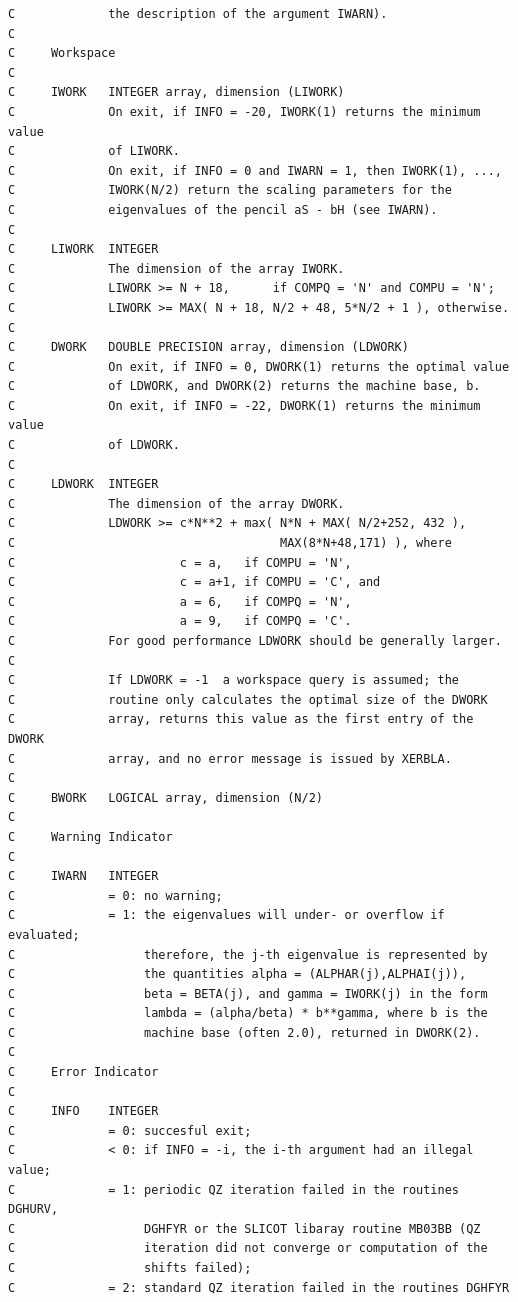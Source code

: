 \documentclass[a4paper,10pt]{article}
\begin{document}
\begin{verbatim}
C             the description of the argument IWARN).
C
C     Workspace
C
C     IWORK   INTEGER array, dimension (LIWORK)
C             On exit, if INFO = -20, IWORK(1) returns the minimum value
C             of LIWORK.
C             On exit, if INFO = 0 and IWARN = 1, then IWORK(1), ...,
C             IWORK(N/2) return the scaling parameters for the
C             eigenvalues of the pencil aS - bH (see IWARN).
C
C     LIWORK  INTEGER
C             The dimension of the array IWORK.
C             LIWORK >= N + 18,      if COMPQ = 'N' and COMPU = 'N';
C             LIWORK >= MAX( N + 18, N/2 + 48, 5*N/2 + 1 ), otherwise.
C
C     DWORK   DOUBLE PRECISION array, dimension (LDWORK)
C             On exit, if INFO = 0, DWORK(1) returns the optimal value
C             of LDWORK, and DWORK(2) returns the machine base, b.
C             On exit, if INFO = -22, DWORK(1) returns the minimum value
C             of LDWORK.
C
C     LDWORK  INTEGER
C             The dimension of the array DWORK.
C             LDWORK >= c*N**2 + max( N*N + MAX( N/2+252, 432 ),
C                                     MAX(8*N+48,171) ), where
C                       c = a,   if COMPU = 'N',
C                       c = a+1, if COMPU = 'C', and
C                       a = 6,   if COMPQ = 'N',
C                       a = 9,   if COMPQ = 'C'.
C             For good performance LDWORK should be generally larger.
C
C             If LDWORK = -1  a workspace query is assumed; the
C             routine only calculates the optimal size of the DWORK
C             array, returns this value as the first entry of the DWORK
C             array, and no error message is issued by XERBLA.
C
C     BWORK   LOGICAL array, dimension (N/2)
C
C     Warning Indicator
C
C     IWARN   INTEGER
C             = 0: no warning;
C             = 1: the eigenvalues will under- or overflow if evaluated;
C                  therefore, the j-th eigenvalue is represented by
C                  the quantities alpha = (ALPHAR(j),ALPHAI(j)),
C                  beta = BETA(j), and gamma = IWORK(j) in the form
C                  lambda = (alpha/beta) * b**gamma, where b is the
C                  machine base (often 2.0), returned in DWORK(2).
C
C     Error Indicator
C
C     INFO    INTEGER
C             = 0: succesful exit;
C             < 0: if INFO = -i, the i-th argument had an illegal value;
C             = 1: periodic QZ iteration failed in the routines DGHURV,
C                  DGHFYR or the SLICOT libaray routine MB03BB (QZ
C                  iteration did not converge or computation of the
C                  shifts failed);
C             = 2: standard QZ iteration failed in the routines DGHFYR

\end{verbatim}
\end{document}

